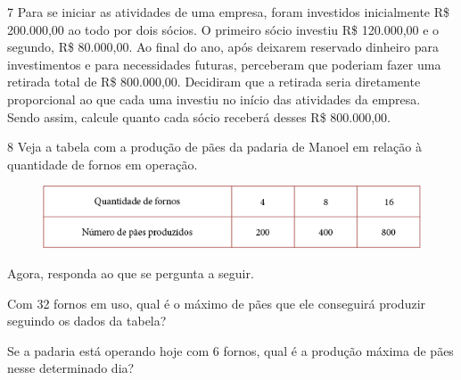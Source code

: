 \num{7} Para se iniciar as atividades de uma empresa, foram investidos
inicialmente R\$ 200.000,00 ao todo por dois sócios. O primeiro
sócio investiu R\$ 120.000,00 e o segundo, R\$ 80.000,00. Ao final do ano,
após deixarem reservado dinheiro para investimentos e para necessidades
futuras, perceberam que poderiam fazer uma retirada total de R\$ 800.000,00. Decidiram que a retirada seria diretamente proporcional ao que
cada uma investiu no início das atividades da empresa. Sendo assim,
calcule quanto cada sócio receberá desses R\$ 800.000,00.

\begin{mdframed}[linewidth=2pt,linecolor=salmao,roundcorner=2pt]





\vspace{2cm}
\end{mdframed}

\num{8} Veja a tabela com a produção de pães da padaria de Manoel em relação à quantidade de fornos em operação.

\begin{figure}[htpb!]
\centering
\includegraphics[width=\textwidth]{media/image71.png}
\end{figure}

\pagebreak
Agora, responda ao que se pergunta a seguir.

\begin{escolha}
\item
  Com 32 fornos em uso, qual é o máximo de pães que ele conseguirá
  produzir seguindo os dados da tabela?

\item {}

\item
  Se a padaria está operando hoje com 6 fornos, qual é a produção máxima
  de pães nesse determinado dia?

\item {}
\end{escolha}

